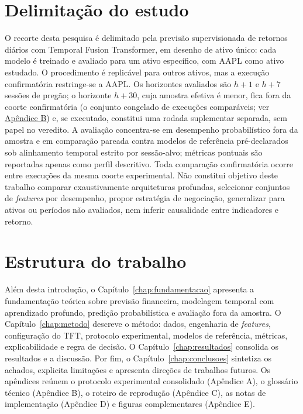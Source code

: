 \section{Delimitação do estudo} \label{sec:delimitacao}
O recorte desta pesquisa é delimitado pela previsão supervisionada de retornos diários com Temporal Fusion Transformer, em desenho de ativo único: cada modelo é treinado e avaliado para um ativo específico, com AAPL como ativo estudado. O procedimento é replicável para outros ativos, mas a execução confirmatória restringe-se a AAPL. Os horizontes avaliados são \(h+1\) e \(h+7\) sessões de pregão; o horizonte \(h+30\), cuja amostra efetiva é menor, fica fora da coorte confirmatória (o conjunto congelado de execuções comparáveis; ver \hyperref[gl:coorte]{Apêndice B}) e, se executado, constitui uma rodada suplementar separada, sem papel no veredito. A avaliação concentra-se em desempenho probabilístico fora da amostra e em comparação pareada contra modelos de referência pré-declarados sob alinhamento temporal estrito por sessão-alvo; métricas pontuais são reportadas apenas como perfil descritivo. Toda comparação confirmatória ocorre entre execuções da mesma coorte experimental. Não constitui objetivo deste trabalho comparar exaustivamente arquiteturas profundas, selecionar conjuntos de \textit{features} por desempenho, propor estratégia de negociação, generalizar para ativos ou períodos não avaliados, nem inferir causalidade entre indicadores e retorno.

\section{Estrutura do trabalho}
Além desta introdução, o Capítulo~\ref{chap:fundamentacao} apresenta a fundamentação teórica sobre previsão financeira, modelagem temporal com aprendizado profundo, predição probabilística e avaliação fora da amostra. O Capítulo~\ref{chap:metodo} descreve o método: dados, engenharia de \textit{features}, configuração do TFT, protocolo experimental, modelos de referência, métricas, explicabilidade e regra de decisão. O Capítulo~\ref{chap:resultados} consolida os resultados e a discussão. Por fim, o Capítulo~\ref{chap:conclusoes} sintetiza os achados, explicita limitações e apresenta direções de trabalhos futuros. Os apêndices reúnem o protocolo experimental consolidado (Apêndice A), o glossário técnico (Apêndice B), o roteiro de reprodução (Apêndice C), as notas de implementação (Apêndice D) e figuras complementares (Apêndice E).
